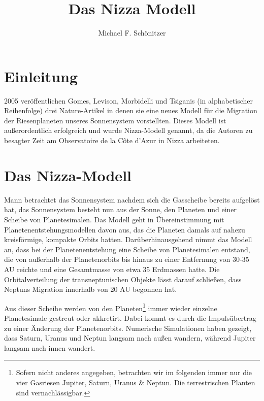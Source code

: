\documentclass[10pt,a4paper,twoside]{article}
\author{Michael F. Schönitzer}
\title{Das Nizza Modell}
\begin{document}
\maketitle

\section{Einleitung}
2005 veröffentlichen Gomes, Levison, Morbidelli und Tsiganis (in alphabetischer Reihenfolge) drei Nature-Artikel\cite{Gomes2005}\cite{Tsiganis2005}\cite{Morbidelli2005} %
in denen sie eine neues Modell für die Migration der Riesenplaneten unseres Sonnensystem vorstellten. Dieses Modell ist außerordentlich erfolgreich und wurde Nizza-Modell genannt, da die Autoren zu besagter Zeit am Observatoire de la Côte d’Azur in Nizza arbeiteten.



\section{Das Nizza-Modell}
Mann betrachtet das Sonnensystem nachdem sich die Gasscheibe bereits aufgelöst hat, das Sonnensystem besteht nun aus der Sonne, den Planeten und einer Scheibe von Planetesimalen. Das Modell geht in Übereinstimmung mit Planetenentstehungsmodellen %
davon aus, das die Planeten damals auf nahezu kreisförmige, kompakte Orbits hatten. %
Darüberhinausgehend nimmt das Modell an, dass bei der Planetenentstehung eine Scheibe von Planetesimalen entstand, die von außerhalb der Planetenorbits bis hinaus zu einer Entfernung von 30-35 AU\cite{Tsiganis2005} reichte und eine Gesamtmasse von etwa 35 Erdmassen hatte. %
Die Orbitalverteilung der transneptunischen Objekte lässt darauf schließen, dass Neptuns Migration innerhalb von 20 AU begonnen hat.\cite{Tsiganis2005}

Aus dieser Scheibe werden von den Planeten\footnote{Sofern nicht anderes angegeben, betrachten wir im folgenden immer nur die vier Gasriesen Jupiter, Saturn, Uranus \& Neptun. Die terrestrischen Planten sind vernachlässigbar.} immer wieder einzelne Planetesimale gestreut oder akkretirt. Dabei kommt es durch die Impulsübertrag zu einer Änderung der Planetenorbits.\cite{Tsiganis2005} %
Numerische Simulationen haben gezeigt, dass Saturn, Uranus und Neptun langsam nach außen wandern, während Jupiter langsam nach innen wandert.\cite{Tsiganis2005}\cite{Hahn1999} %
\end{document}
